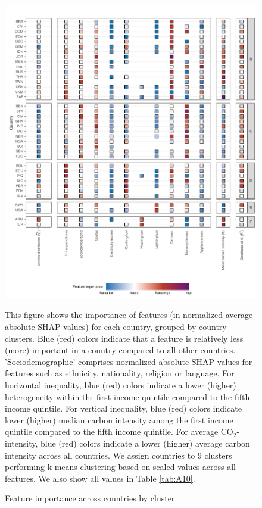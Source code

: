 \documentclass[12pt, a4paper]{article}
\newenvironment{subcaption}
{\strut
\vspace{-5pt}
\begin{minipage}[b]{0.9\textwidth}
  \hspace*{-\parindent}
  \footnotesize}
 {\end{minipage}}
\begin{document}
\begin{figure}[ht!]
    \centering
    \includegraphics{Figure 4/Figure_4_Corrected_2}
    \caption{Feature importance across countries by cluster}
    \label{fig:fig_4_2}
    \begin{subcaption}
    This figure shows the importance of features (in normalized average absolute SHAP-values) for each country, grouped by country clusters. Blue (red) colors indicate that a feature is relatively less (more) important in a country compared to all other countries. 'Sociodemographic' comprises normalized absolute SHAP-values for features such as ethnicity, nationality, religion or language.
    For horizontal inequality, blue (red) colors indicate a lower (higher) heterogeneity within the first income quintile compared to the fifth income quintile. For vertical inequality, blue (red) colors indicate lower (higher) median carbon intensity among the first income quintile compared to the fifth income quintile. For average CO$_{2}$-intensity, blue (red) colors indicate a lower (higher) average carbon intensity across all countries.
    We assign countries to 9 clusters performing k-means clustering based on scaled values across all features. We also show all values in Table \ref{tab:A10}.
    \end{subcaption}
\end{figure}
\end{document}
